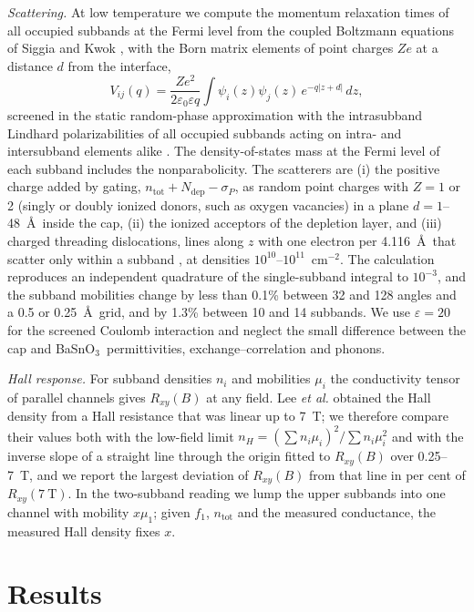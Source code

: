 \documentclass[11pt]{article}
\newcommand{\BSO}{\texorpdfstring{BaSnO$_3$}{BaSnO3}}
\newcommand{\ntot}{n_\mathrm{tot}}
\begin{document}
\emph{Scattering.} At low temperature we compute the momentum relaxation times of all occupied subbands at the Fermi level from the coupled Boltzmann equations of Siggia and Kwok \cite{SiggiaKwok1970}, with the Born matrix elements of point charges $Ze$ at a distance $d$ from the interface,
\begin{equation}
V_{ij}(q)=\frac{Ze^2}{2\varepsilon_0\varepsilon q}\int\psi_i(z)\psi_j(z)\,e^{-q|z+d|}\,dz ,
\end{equation}
screened in the static random-phase approximation with the intrasubband Lindhard polarizabilities of all occupied subbands acting on intra- and intersubband elements alike \cite{SiggiaKwok1970,AFS1982}. The density-of-states mass at the Fermi level of each subband includes the nonparabolicity. The scatterers are (i) the positive charge added by gating, $\ntot+N_\mathrm{dep}-\sigma_P$, as random point charges with $Z=1$ or 2 (singly or doubly ionized donors, such as oxygen vacancies) in a plane $d=1$--48~\AA\ inside the cap, (ii) the ionized acceptors of the depletion layer, and (iii) charged threading dislocations, lines along $z$ with one electron per 4.116~\AA\ that scatter only within a subband \cite{Jena2000}, at densities $10^{10}$--$10^{11}$~cm$^{-2}$. The calculation reproduces an independent quadrature of the single-subband integral to $10^{-3}$, and the subband mobilities change by less than 0.1\% between 32 and 128 angles and a 0.5 or 0.25~\AA\ grid, and by 1.3\% between 10 and 14 subbands. We use $\varepsilon=20$ for the screened Coulomb interaction and neglect the small difference between the cap and \BSO\ permittivities, exchange--correlation and phonons.

\emph{Hall response.} For subband densities $n_i$ and mobilities $\mu_i$ the conductivity tensor of parallel channels gives $R_{xy}(B)$ at any field. Lee \emph{et al.} obtained the Hall density from a Hall resistance that was linear up to 7~T; we therefore compare their values both with the low-field limit $n_H=(\sum n_i\mu_i)^2/\sum n_i\mu_i^2$ and with the inverse slope of a straight line through the origin fitted to $R_{xy}(B)$ over 0.25--7~T, and we report the largest deviation of $R_{xy}(B)$ from that line in per cent of $R_{xy}(7\ \mathrm{T})$. In the two-subband reading we lump the upper subbands into one channel with mobility $x\mu_1$; given $f_1$, $\ntot$ and the measured conductance, the measured Hall density fixes $x$.

\section{Results}
\end{document}
